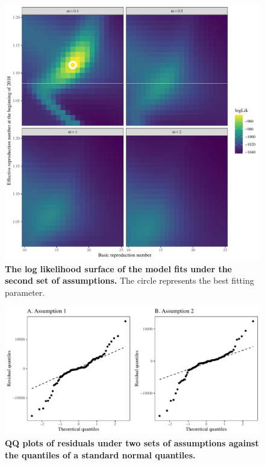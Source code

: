 \documentclass[12pt]{article}
\begin{document}
\pagebreak

\begin{figure}[!th]
\includegraphics[width=\textwidth]{../figure_pub/figure2_logLik_2.pdf}
\caption{
\textbf{The log likelihood surface of the model fits under the second set of assumptions.}
The circle represents the best fitting parameter.
}
\end{figure}


\pagebreak

\begin{figure}[!th]
\includegraphics[width=\textwidth]{../figure_pub/figure2_qq.pdf}
\caption{
\textbf{QQ plots of residuals under two sets of assumptions against the quantiles of a standard normal quantiles.}
}
\end{figure}


\pagebreak



\end{document}
